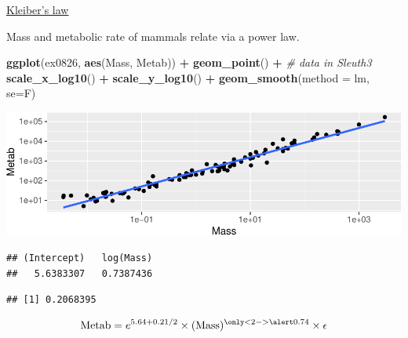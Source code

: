 \documentclass[
  ignorenonframetext,
]{beamer}
\newenvironment{Shaded}{\begin{snugshade}}{\end{snugshade}}
\newcommand{\CommentTok}[1]{\textcolor[rgb]{0.56,0.35,0.01}{\textit{#1}}}
\newcommand{\DataTypeTok}[1]{\textcolor[rgb]{0.13,0.29,0.53}{#1}}
\newcommand{\KeywordTok}[1]{\textcolor[rgb]{0.13,0.29,0.53}{\textbf{#1}}}
\newcommand{\NormalTok}[1]{#1}
\newcommand{\OperatorTok}[1]{\textcolor[rgb]{0.81,0.36,0.00}{\textbf{#1}}}
\newcommand{\StringTok}[1]{\textcolor[rgb]{0.31,0.60,0.02}{#1}}
\begin{document}
\begin{frame}[fragile]{\href{https://en.wikipedia.org/wiki/Kleiber\%27s_law}{Kleiber's
law}}
\protect\hypertarget{kleibers-law}{}

Mass and metabolic rate of mammals relate via a power law. \scriptsize

\begin{Shaded}
\begin{Highlighting}[]
\KeywordTok{ggplot}\NormalTok{(ex0826, }\KeywordTok{aes}\NormalTok{(Mass, Metab)) }\OperatorTok{+}\StringTok{ }\KeywordTok{geom_point}\NormalTok{() }\OperatorTok{+}\StringTok{ }\CommentTok{# data in Sleuth3}
\StringTok{  }\KeywordTok{scale_x_log10}\NormalTok{() }\OperatorTok{+}\StringTok{ }\KeywordTok{scale_y_log10}\NormalTok{() }\OperatorTok{+}\StringTok{ }\KeywordTok{geom_smooth}\NormalTok{(}\DataTypeTok{method =}\NormalTok{ lm, }\DataTypeTok{se=}\NormalTok{F)}
\end{Highlighting}
\end{Shaded}

\includegraphics{signal_files/figure-beamer/unnamed-chunk-3-1.pdf}

\begin{Shaded}
\end{Shaded}

\begin{verbatim}
## (Intercept)   log(Mass) 
##   5.6383307   0.7387436
\end{verbatim}

\begin{verbatim}
## [1] 0.2068395
\end{verbatim}

\normalsize

\[
\text{Metab}=e^{5.64+0.21/2}\times(\text{Mass})^{\only<2->{\alert}{0.74}} \times \epsilon
\]

\end{frame}
\end{document}

